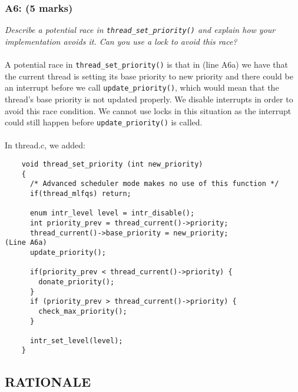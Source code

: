\documentclass{article}
\begin{document}
\subsubsection*{A6: (5 marks) }
\textit{Describe a potential race in \texttt{thread\_set\_priority()} and explain how your implementation avoids it.  Can you use a lock to avoid this race?}
\\ \\
A potential race in \texttt{thread\_set\_priority()} is that in (line A6a) we have that the current thread is setting its base priority to new priority and there could be an interrupt before we call \texttt{update\_priority()}, which would mean that the thread's base priority is not updated properly. We disable interrupts in order to avoid this race condition. We cannot use locks in this situation as the interrupt could still happen before \texttt{update\_priority()} is called.
\\ \\
In thread.c, we added:
\begin{lstlisting}
    void thread_set_priority (int new_priority)
    {
      /* Advanced scheduler mode makes no use of this function */
      if(thread_mlfqs) return;

      enum intr_level level = intr_disable();
      int priority_prev = thread_current()->priority;
      thread_current()->base_priority = new_priority;                                   (Line A6a)
      update_priority();

      if(priority_prev < thread_current()->priority) {
        donate_priority();
      }
      if (priority_prev > thread_current()->priority) {
        check_max_priority();
      }

      intr_set_level(level);
    }
\end{lstlisting}


\subsection{RATIONALE}
\end{document}
